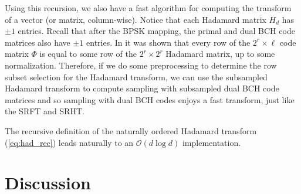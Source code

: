 \documentclass[12pt]{article}
\begin{document}
   \noindent Using this recursion, we also have a fast algorithm for computing the transform of a vector (or matrix, column-wise).  Notice that each Hadamard matrix $H_d$ has $\pm 1$ entries.  Recall that after the BPSK mapping, the primal and dual BCH code matrices also have $\pm 1$ entries.  In \cite{ailon2009fast} it was shown that every row of the $2^r\times \ell$ code matrix $\Phi$ is equal to some row of the $2^r\times 2^r$ Hadamard matrix, up to some normalization.  Therefore, if we do some preprocessing to determine the row subset selection for the Hadamard transform, we can use the subsampled Hadamard transform to compute sampling with subsampled dual BCH code matrices and so sampling with dual BCH codes enjoys a fast transform, just like the SRFT and SRHT.

   The recursive definition of the naturally ordered Hadamard transform (\ref{eq:had_rec}) leads naturally to an $\mathcal{O}(d\log d)$ implementation.%



\section{Discussion}






 
\end{document}
